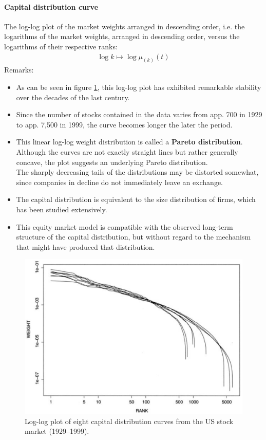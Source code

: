 \documentclass[a4paper,landscape,8pt,fleqn]{scrartcl}
\renewcommand{\emph}[1]{\textbf{#1}}
\begin{document}
\begin{multicols*}{3}
\paragraph{Capital distribution curve} The log-log plot of the market weights arranged in descending order, i.e. the logarithms of the market weights, arranged in descending order, versus the logarithms of their respective ranks:
\begin{align*}
\log k \mapsto \log \mu_{(k)}(t)
\end{align*}
Remarks:
\begin{itemize}
\item As can be seen in figure \ref{fig:CapDistrLogLog}, this log-log plot has exhibited remarkable stability over the decades of the last century.
\item Since the number of stocks contained in the data varies from app. 700 in 1929 to app. 7,500 in 1999, the curve becomes longer the later the period.
\item This linear log-log weight distribution is called a \emph{Pareto distribution}. \\
Although the curves are not exactly straight lines but rather generally concave, the plot suggests an underlying Pareto distribution. \\
The sharply decreasing tails of the distributions may be distorted somewhat, since companies in decline do not immediately leave an exchange.
\item The capital distribution is equivalent to the size distribution of firms, which has been studied extensively.
\item This equity market model is compatible with the observed long-term structure of the capital distribution, but without regard to the mechanism that might have produced that distribution.
\end{itemize}

\begin{figure}[H]
\centering
\includegraphics[width=0.8 \linewidth]{CapitalDistributionUS}
\caption{Log-log plot of eight capital distribution curves from the US stock market (1929--1999).}
\label{fig:CapDistrLogLog}
\end{figure}


\end{multicols*}
\end{document}

